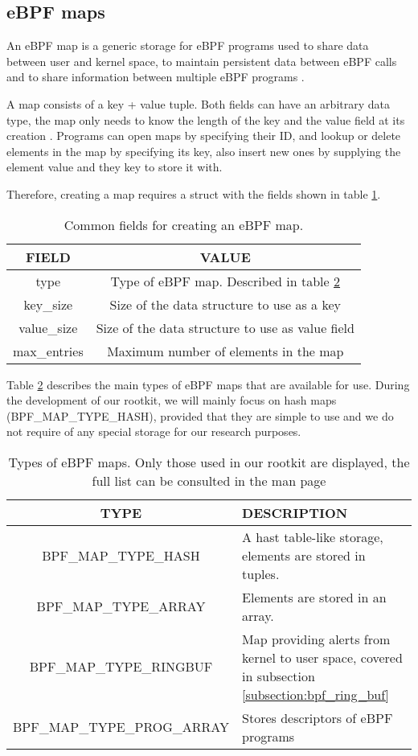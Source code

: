 \subsection{eBPF maps} \label{subsection:ebpf_maps}
An eBPF map is a generic storage for eBPF programs used to share data between user and kernel space, to maintain persistent data between eBPF calls and to share information between multiple eBPF programs \cite{ebpf_maps_kernel}.

A map consists of a key + value tuple. Both fields can have an arbitrary data type, the map only needs to know the length of the key and the value field at its creation \cite{bpf_syscall}. Programs can open maps by specifying their ID, and lookup or delete elements in the map by specifying its key, also insert new ones by supplying the element value and they key to store it with.

Therefore, creating a map requires a struct with the fields shown in table \ref{table:ebpf_map_struct}.

\begin{table}[htbp]
\begin{tabular}{|c|c|}
\hline
FIELD & VALUE\\
\hline
type & Type of eBPF map. Described in table \ref{table:ebpf_map_types}\\
key\_size & Size of the data structure to use as a key\\
value\_size & Size of the data structure to use as value field\\
max\_entries & Maximum number of elements in the map\\
\hline
\end{tabular}
\caption{Common fields for creating an eBPF map.}
\label{table:ebpf_map_struct}
\end{table}

Table \ref{table:ebpf_map_types} describes the main types of eBPF maps that are available for use. During the development of our rootkit, we will mainly focus on hash maps (BPF\_MAP\_TYPE\_HASH), provided that they are simple to use and we do not require of any special storage for our research purposes.

\begin{table}[htbp]
\begin{tabular}{|c|>{\centering\arraybackslash}p{10cm}|}
\hline
TYPE & DESCRIPTION\\
\hline
BPF\_MAP\_TYPE\_HASH & A hast table-like storage, elements are stored in tuples.\\
BPF\_MAP\_TYPE\_ARRAY & Elements are stored in an array.\\
BPF\_MAP\_TYPE\_RINGBUF & Map providing alerts from kernel to user space, covered in subsection \ref{subsection:bpf_ring_buf}\\
BPF\_MAP\_TYPE\_PROG\_ARRAY & Stores descriptors of eBPF programs\\
\hline
\hline
\end{tabular}
\caption{Types of eBPF maps. Only those used in our rootkit are displayed, the full list can be consulted in the man page \cite{bpf_syscall}}
\label{table:ebpf_map_types}
\end{table}

